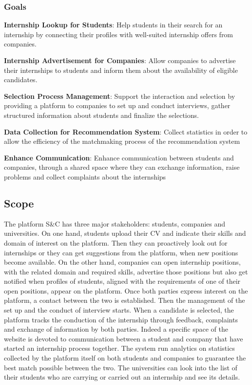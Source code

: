     \subsubsection{Goals}
        \begin{enumerate}[label={[G\arabic*]}]
            \item \textbf{Internship Lookup for Students}: 
                Help students in their search for an internship by connecting their profiles with well-suited internship offers from companies.
            \item \textbf{Internship Advertisement for Companies}: 
                Allow companies to advertise their internships to students and inform them about the availability of eligible candidates.
            \item \textbf{Selection Process Management}: 
                Support the interaction and selection by providing a platform to companies to set up and conduct interviews, gather structured information about students and finalize the selections.
            \item \textbf{Data Collection for Recommendation System}: 
                Collect statistics in order to allow the efficiency of the matchmaking process of the recommendation system 
            \item \textbf{Enhance Communication}: 
                Enhance communication between students and companies, through a shared space where they can exchange information, raise problems and collect complaints about the internships
        \end{enumerate}


\subsection{Scope}
    The platform S\&C has three major stakeholders: students, companies and universities. On one hand, students upload their CV and indicate their skills and domain of interest on the platform. Then they can proactively look out for internships or they can get suggestions from the platform, when new positions become available. On the other hand, companies can open internship positions, with the related domain and required skills, advertise those positions but also get notified when profiles of students, aligned with the requirements of one of their open positions, appear on the platform.
    Once both parties express interest on the platform, a contact between the two is established. Then the management of the set up and the conduct of interview starts. When a candidate is selected, the platform tracks the conduction of the internship through feedback, complaints and exchange of information by both parties. Indeed a specific space of the website is devoted to communication between a student and company that have started an internship process together. The system run analytics on statistics collected by the platform itself on both students and companies to guarantee the best match possible between the two.
    The universities can look into the list of their students who are carrying or carried out an internship and see its details.
    \newpage
